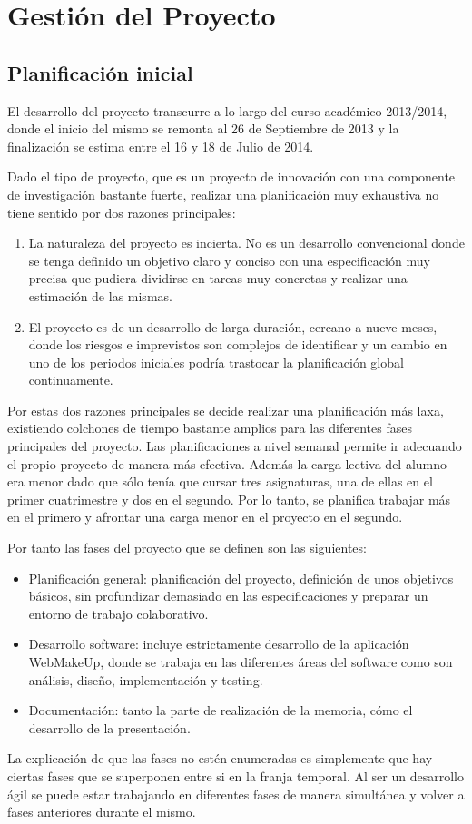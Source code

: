 \chapter{Gestión del Proyecto}
\label{cha:gestion}

\section{Planificación inicial}
\label{sec:Planificacion}

El desarrollo del proyecto transcurre a lo largo del curso académico 2013/2014, donde el inicio del mismo se remonta al 26 de Septiembre de 2013 y la finalización se estima entre el 16 y 18 de Julio de 2014.

Dado el tipo de proyecto, que es un proyecto de innovación con una componente de investigación bastante fuerte, realizar una planificación muy exhaustiva no tiene sentido por dos razones principales:
\begin{enumerate}
\item{La naturaleza del proyecto es incierta. No es un desarrollo convencional donde se tenga definido un objetivo claro y conciso con una especificación muy precisa que pudiera dividirse en tareas muy concretas y realizar una estimación de las mismas.}
\item{El proyecto es de un desarrollo de larga duración, cercano a nueve meses, donde los riesgos e imprevistos son complejos de identificar y un cambio en uno de los periodos iniciales podría trastocar la planificación global continuamente.}
\end{enumerate}

Por estas dos razones principales se decide realizar una planificación más laxa, existiendo colchones de tiempo bastante amplios para las diferentes fases principales del proyecto. Las planificaciones a nivel semanal permite ir adecuando el propio proyecto de manera más efectiva. Además la carga lectiva del alumno era menor dado que sólo tenía que cursar tres asignaturas, una de ellas en el primer cuatrimestre y dos en el segundo. Por lo tanto, se planifica trabajar más en el primero y afrontar una carga menor en el proyecto en el segundo.

Por tanto las fases del proyecto que se definen son las siguientes:
\begin{itemize}
\item{Planificación general: planificación del proyecto, definición de unos objetivos básicos, sin profundizar demasiado en las especificaciones y preparar un entorno de trabajo colaborativo.}
\item{Desarrollo software: incluye estrictamente desarrollo de la aplicación WebMakeUp, donde se trabaja en las diferentes áreas del software como son análisis, diseño, implementación y testing.}
\item{Documentación: tanto la parte de realización de la memoria, cómo el desarrollo de la presentación.}
\end{itemize}
La explicación de que las fases no estén enumeradas es simplemente que hay ciertas fases que se superponen entre si en la franja temporal. Al ser un desarrollo ágil se puede estar trabajando en diferentes fases de manera simultánea y volver a fases anteriores durante el mismo.


